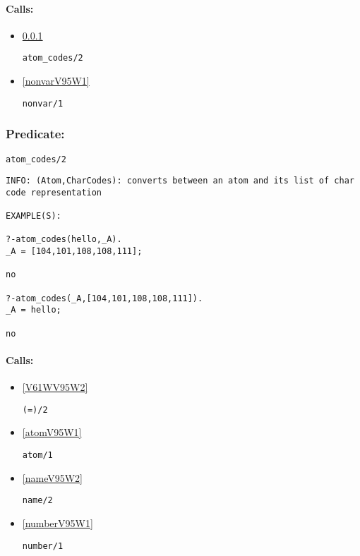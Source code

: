 \paragraph{Calls:} 
\begin{itemize}
\item \ref{atomV95WcodesV95W2} 
\begin{verbatim}
atom_codes/2
\end{verbatim}

\item \ref{nonvarV95W1} 
\begin{verbatim}
nonvar/1
\end{verbatim}

\end{itemize}

\subsubsection{Predicate:} \label{atomV95WcodesV95W2}

\begin{verbatim}
atom_codes/2
\end{verbatim}

{\small \begin{verbatim}
INFO: (Atom,CharCodes): converts between an atom and its list of char code representation

EXAMPLE(S):

?-atom_codes(hello,_A).
_A = [104,101,108,108,111];

no

?-atom_codes(_A,[104,101,108,108,111]).
_A = hello;

no

\end{verbatim}}
\paragraph{Calls:} 
\begin{itemize}
\item \ref{V61WV95W2} 
\begin{verbatim}
(=)/2
\end{verbatim}

\item \ref{atomV95W1} 
\begin{verbatim}
atom/1
\end{verbatim}

\item \ref{nameV95W2} 
\begin{verbatim}
name/2
\end{verbatim}

\item \ref{numberV95W1} 
\begin{verbatim}
number/1
\end{verbatim}

\end{itemize}
